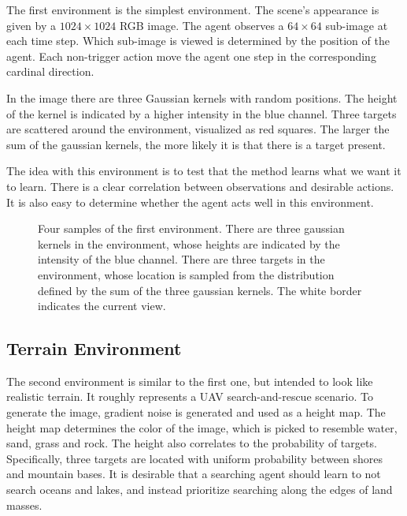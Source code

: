 The first environment is the simplest environment. 
The scene's appearance is given by a \(1024 \times 1024\) RGB image.
The agent observes a \(64 \times 64\) sub-image at each time step.
Which sub-image is viewed is determined by the position of the agent.
Each non-trigger action move the agent one step in the corresponding cardinal direction.

In the image there are three Gaussian kernels with random positions.
The height of the kernel is indicated by a higher intensity in the blue channel.
Three targets are scattered around the environment, visualized as red squares.
The larger the sum of the gaussian kernels, the more likely it is that there is a target present.

The idea with this environment is to test that the method learns what we want it to learn.
There is a clear correlation between observations and desirable actions.
It is also easy to determine whether the agent acts well in this environment.


\begin{figure}
    \centering
    
    \label{fig:gaussian}
    \caption[Gaussian environment]{Four samples of the first environment. There are three gaussian kernels in the environment, whose heights are indicated by the intensity of the blue channel. There are three targets in the environment, whose location is sampled from the distribution defined by the sum of the three gaussian kernels. The white border indicates the current view.}
\end{figure}

\subsection{Terrain Environment}

The second environment is similar to the first one, but intended to look like realistic terrain.
It roughly represents a UAV search-and-rescue scenario.
To generate the image, gradient noise is generated and used as a height map.
The height map determines the color of the image, which is picked to resemble water, sand, grass and rock.
The height also correlates to the probability of targets.
Specifically, three targets are located with uniform probability between shores and mountain bases.
It is desirable that a searching agent should learn to not search oceans and lakes, and instead prioritize searching along the edges of land masses.

